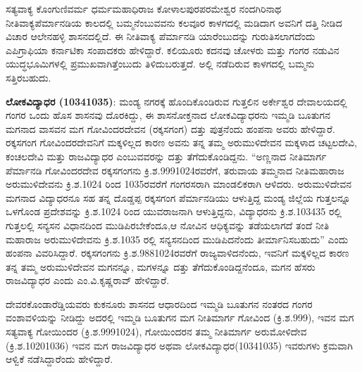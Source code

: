 ಸತ್ಯವಾಕ್ಯ ಕೊಂಗುಣಿವರ್ಮ ಧರ್ಮಮಹಾಧಿರಾಜ ಕೋಳಾಲಪುರಪರಮೇಶ್ವರ ನಂದಗಿರಿನಾಥ ನೀತಿವಾಕ್ಯ\break ಪೆರ್ಮಾನಡಿಯ ಕಾಲದಲ್ಲಿ ಬಮ್ಮನೆಂಬುವವನು ಕಲವೂರ ಕಾಳಗದಲ್ಲಿ ಮಡಿದಾಗ ಅವನಿಗೆ ದತ್ತಿ ನೀಡಿದ ವಿಚಾರ ಆಲೇನಹಳ್ಳಿ ಶಾಸನದಲ್ಲಿದೆ. ಈ ನೀತಿವಾಕ್ಯ ಪೆರ್ಮಾನಡಿ ಯಾರೆಂಬುದನ್ನು ಗುರುತಿಸಲಾಗದೆಂದು ಎಪಿಗ್ರಾಫಿಯಾ ಕರ್ನಾಟಿಕಾ ಸಂಪಾದಕರು ಹೇಳಿದ್ದಾರೆ. ಕಲಿಯೂರು ಕದನವು ಚೋಳರು ಮತ್ತು ಗಂಗರ ನಡುವಿನ ಯುದ್ಧಭೂಮಿಗಳಲ್ಲಿ ಪ್ರಮುಖವಾಗಿ\-ತ್ತೆಂಬುದು ತಿಳಿದುಬರುತ್ತದೆ. ಅಲ್ಲಿ ನಡೆದಿರುವ ಕಾಳಗದಲ್ಲಿ ಬಮ್ಮನು ಸತ್ತಿರಬಹುದು.

\textbf{ಲೋಕವಿದ್ಯಾಧರ (10341035)}: ಮಂಡ್ಯ ನಗರಕ್ಕೆ ಹೊಂದಿಕೊಂಡಿರುವ ಗುತ್ತಲಿನ ಅರ್ಕೇಶ್ವರ ದೇವಾಲಯದಲ್ಲಿ ಗಂಗರ ಒಂದು ಹೊಸ ಶಾಸನವು ದೊರಕಿದ್ದು, ಈ ಶಾಸನೋಕ್ತನಾದ ಲೋಕವಿದ್ಯಾಧರನು ಇಮ್ಮಡಿ ಬೂತುಗನ ಮಗನಾದ ವಾಸವನ ಮಗ ಗೋವಿಂದರದೇವನ (ರಕ್ಕಸಗಂಗ) ದತ್ತು ಪುತ್ರನೆಂದು ಹಂಪನಾ ಅವರು ಹೇಳಿದ್ದಾರೆ. ರಕ್ಕಸಗಂಗ ಗೋವಿಂದರದೇವನಿಗೆ ಮಕ್ಕಳಿಲ್ಲದ ಕಾರಣ ಅವನು ತನ್ನ ತಮ್ಮ ಅರುಮುಳಿದೇವನ ಮಕ್ಕಳಾದ ಚಟ್ಟಲದೇವಿ, ಕಂಚಲದೇವಿ ಮತ್ತು ರಾಜವಿದ್ಯಾಧರ ಎಂಬುವವರನ್ನು ದತ್ತು ತೆಗೆದುಕೊಂಡಿದ್ದನು. “ಅಣ್ಣನಾದ ನೀತಿಮಾರ್ಗ ಪೆರ್ಮಾನಡಿ ಗೋವಿಂದರದೇವ ರಕ್ಕಸಗಂಗನು ಕ್ರಿ.ಶ.9991024ರವರೆಗೆ, ತರುವಾಯ ತಮ್ಮನಾದ ನೀತಿಮಹಾರಾಜ ಅರುಮುಳಿದೇವನು ಕ್ರಿ.ಶ.1024 ರಿಂದ 1035ರವರೆಗೆ ಗಂಗರಸರಾಗಿ ಮಾಂಡಲಿಕರಾಗಿ ಆಳಿದರು. ಅರುಮುಳಿದೇವನ ಮಗನಾದ ವಿದ್ಯಾಧರನೂ ಸಹ ತನ್ನ ದೊಡ್ಡಪ್ಪ ರಕ್ಕಸಗಂಗ ಪೆರ್ಮಾನಡಿಯು ಆಳುತ್ತಿದ್ದ ಮಂಡ್ಯ ಜಿಲ್ಲೆಯ ಗುತ್ತಲನ್ನೂ ಒಳಗೊಂಡ ಪ್ರದೇಶವನ್ನು ಕ್ರಿ.ಶ.1024 ರಿಂದ ಯುವರಾಜನಾಗಿ ಆಳುತ್ತಿದ್ದನು, ವಿದ್ಯಾಧರನು ಕ್ರಿ.ಶ.103435 ರಲ್ಲಿ ಗುತ್ತಲಲ್ಲಿ ಸನ್ಯಸನ ವಿಧಾನದಿಂದ ಮುಡಿಪಿರಬೇಕೆಂದೂ,ಆ ನೋವಿನ ಆಧಿಕ್ಯವನ್ನು ತಡೆಯಲಾಗದೆ ತಂದೆ ನೀತಿ ಮಹಾರಾಜ ಅರುಮುಳಿದೇವನು ಕ್ರಿ.ಶ.1035 ರಲ್ಲಿ ಸನ್ಯಸನದಿಂದ ಮುಡಿಪಿದನೆಂದು ತೀರ್ಮಾನಿಸಬಹುದು” ಎಂದು ಹಂಪನಾ ವಿವರಿಸಿದ್ದಾರೆ. ರಕ್ಕಸಗಂಗನು ಕ್ರಿ.ಶ.9881024ರವರೆಗೆ ರಾಜ್ಯವಾಳಿದನೆಂದು, ಇವನಿಗೆ ಮಕ್ಕಳಿಲ್ಲದ ಕಾರಣ ತನ್ನ ತಮ್ಮ ಅರುಮುಳಿದೇವನ ಮಗನನ್ನೂ, ಮಗಳನ್ನೂ ದತ್ತು ತೆಗೆದುಕೊಂಡಿದ್ದನೆಂದೂ, ಮಗನ ಹೆಸರು ರಾಜವಿದ್ಯಾಧರ ಎಂದು ಎಂ.ವಿ.ಕೃಷ್ಣರಾವ್​ ಹೇಳಿದ್ದಾರೆ.

ದೇವರಕೊಂಡಾರೆಡ್ಡಿಯವರು ಕುಕನೂರು ಶಾಸನದ ಆಧಾರದಿಂದ ಇಮ್ಮಡಿ ಬೂತುಗನ ನಂತರದ ಗಂಗರ ವಂಶಾವಳಿಯನ್ನು ನೀಡಿದ್ದು ಅದರಲ್ಲಿ ಇಮ್ಮಡಿ ಬೂತುಗನ ಮಗ ನೀತಿಮಾರ್ಗ ಗೋವಿಂದ (ಕ್ರಿ.ಶ.999), ಇವನ ಮಗ ಸತ್ಯವಾಕ್ಯ ಗೋಯಿಂದರ (ಕ್ರಿ.ಶ.9991024), ಗೋಯಿಂದರನ ತಮ್ಮ ನೀತಿಮಾರ್ಗ ಅರುಮೋಳಿದೇವ (ಕ್ರಿ.ಶ.10201036) ಇವನ ಮಗ ರಾಜವಿದ್ಯಾಧರ ಅಥವಾ ಲೋಕವಿದ್ಯಾಧರ(10341035) ಇವರುಗಳು ಕ್ರಮವಾಗಿ ಆಳ್ವಿಕೆ ನಡೆಸಿದ್ದಾರೆಂದು ಹೇಳಿದ್ದಾರೆ.

